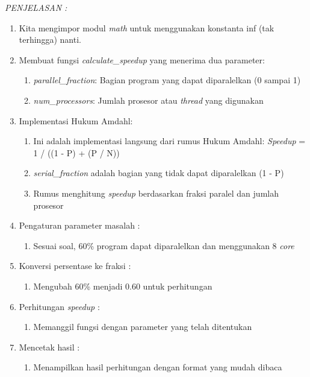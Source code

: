 \documentclass[12pt]{article}
\begin{document}
\begin{enumerate}
\textit{PENJELASAN : }
\begin{enumerate}
    \item Kita mengimpor modul \textit{math} untuk menggunakan konstanta inf (tak terhingga) nanti.
    \item Membuat fungsi \textit{calculate\_speedup} yang menerima dua parameter:
        \begin{enumerate}
            \item \textit{parallel\_fraction}: Bagian program yang dapat diparalelkan (0 sampai 1)
            \item \textit{num\_processors}: Jumlah prosesor atau \textit{thread} yang digunakan
        \end{enumerate}
    \item Implementasi Hukum Amdahl:
        \begin{enumerate}
            \item Ini adalah implementasi langsung dari rumus Hukum Amdahl: \textit{Speedup} = 1 / ((1 - P) + (P / N))
            \item \textit{serial\_fraction} adalah bagian yang tidak dapat diparalelkan (1 - P)
            \item Rumus menghitung \textit{speedup} berdasarkan fraksi paralel dan jumlah prosesor
        \end{enumerate}
    \item Pengaturan parameter masalah :
        \begin{enumerate}
            \item Sesuai soal, 60\% program dapat diparalelkan dan menggunakan 8 \textit{core}
        \end{enumerate}
    \item Konversi persentase ke fraksi :
        \begin{enumerate}
            \item Mengubah 60\% menjadi 0.60 untuk perhitungan
        \end{enumerate}
    \item Perhitungan \textit{speedup} :
        \begin{enumerate}
            \item Memanggil fungsi dengan parameter yang telah ditentukan
        \end{enumerate}
    \item  Mencetak hasil :
        \begin{enumerate}
            \item Menampilkan hasil perhitungan dengan format yang mudah dibaca

\end{enumerate}
\end{enumerate}
\end{enumerate}
\end{document}
